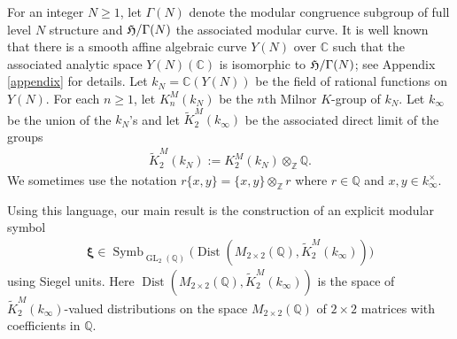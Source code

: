 \documentclass[12pt,amstex,amssymb]{article}
\theoremstyle{plain}
\newcommand{\PP}{\mathbb{P}}
\theoremstyle{definition}
\def\fH{{\frak H}}
\def\Z{{\mathbb Z}}
\def\C{{\mathbb C}}
\def\Q{{\mathbb Q}}
\newcommand{\be}{\begin{eqnarray*}}
\newcommand{\ee}{\end{eqnarray*}}
\newcommand{\GL}{\operatorname{GL}}
\newcommand{\Dist}{\operatorname{Dist}}
\begin{document}
For an integer $N\geq 1$, let $\Gamma(N)$ denote the modular congruence subgroup of full level $N$ structure and $\fH/\Gamma(N)$ the associated modular curve. 
It is well known that there is a smooth affine algebraic curve $Y(N)$ over $\C$ such that the associated analytic space $Y(N)(\C)$ is isomorphic to $\fH/\Gamma(N)$; see Appendix \ref{appendix} for details. Let $k_N=\C(Y(N))$ be the field of rational functions on $Y(N)$. 
For each $n \geq 1$, let $K_n^M(k_N)$ be the $n$th Milnor $K$-group of $k_N$. Let $k_\infty$ be the union of the $k_N$'s and let $\tilde K^M_2(k_\infty)$ be the associated direct limit of the groups
\be
\tilde K^M_2(k_N):=K^M_2(k_N) \otimes_\Z \Q.
\ee
We sometimes use the notation $ r \{x,y\}= \{x,y\} \otimes_\Z r$ where $r \in \Q$ and $x,y \in k_\infty^\times$.

%
%



Using this language, our main result is the construction of an explicit modular symbol
\be
{\bm\xi} \in \operatorname{Symb}_{\GL_2(\Q)} \biggl(\Dist(M_{2\times2}(\Q), \tilde K^M_2(k_\infty))\biggl)
\ee
using Siegel units.
Here $\Dist(M_{2\times2}(\Q), \tilde K^M_2(k_\infty))$ is the space of $\tilde K^M_2(k_\infty)$-valued distributions on the space $M_{2\times2}(\Q)$ of $2\times 2$ matrices with coefficients in $\Q$.


\end{document}
